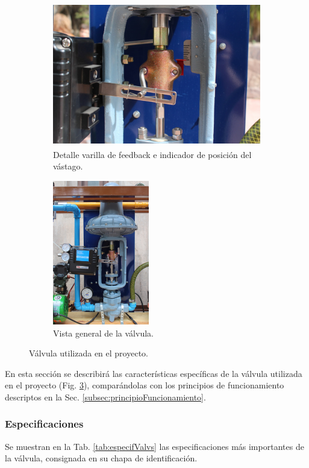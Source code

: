 \begin{figure}[t]
        \centering
        \begin{subfigure}[b]{0.69\textwidth}
        \centering
\includegraphics[height=6.3cm]{Cap2-DisenoEnsamblado/images/IMG_5030.JPG}
 \caption{Detalle varilla de feedback e indicador de posición del vástago.}
 \label{fig:fotoValvDetalle}
        \end{subfigure}%
\hfill
\begin{subfigure}[b]{0.31\textwidth}
\centering
\includegraphics[height=6.3cm]{Cap2-DisenoEnsamblado/images/IMG_5129.JPG}
 \caption{Vista general de la válvula.}
 \label{fig:fotoValvCompl}
        \end{subfigure}
        \caption{Válvula utilizada en el proyecto.}
        \label{fig:fotoValv}
\end{figure}

En esta sección se describirá las características específicas de la válvula
utilizada en el proyecto (Fig. \ref{fig:fotoValv}), comparándolas con los
principios de funcionamiento
descriptos en la Sec. \ref{subsec:principioFuncionamiento}.

\subsubsection{Especificaciones}
Se muestran en la Tab. \ref{tab:especifValvs} las especificaciones más
importantes de la válvula, consignada en su chapa de identificación.


